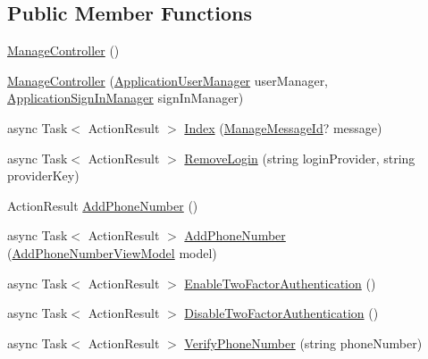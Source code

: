 \subsection*{Public Member Functions}
\begin{DoxyCompactItemize}
\item 
\mbox{\hyperlink{class_brew_day2_1_1_controllers_1_1_manage_controller_af9b638e4fc5bda5789e1a3a0e9a5d6d0}{Manage\+Controller}} ()
\item 
\mbox{\hyperlink{class_brew_day2_1_1_controllers_1_1_manage_controller_ab2152e5900c16e82846b991765fdaccc}{Manage\+Controller}} (\mbox{\hyperlink{class_brew_day2_1_1_application_user_manager}{Application\+User\+Manager}} user\+Manager, \mbox{\hyperlink{class_brew_day2_1_1_application_sign_in_manager}{Application\+Sign\+In\+Manager}} sign\+In\+Manager)
\item 
async Task$<$ Action\+Result $>$ \mbox{\hyperlink{class_brew_day2_1_1_controllers_1_1_manage_controller_a1ebef1a4534bdae4041dd80f558a05bc}{Index}} (\mbox{\hyperlink{class_brew_day2_1_1_controllers_1_1_manage_controller_a418038dc90e9d94606f474b9c06fd8c8}{Manage\+Message\+Id}}? message)
\item 
async Task$<$ Action\+Result $>$ \mbox{\hyperlink{class_brew_day2_1_1_controllers_1_1_manage_controller_abfb50c4f1b23ee3a2808e104712680cb}{Remove\+Login}} (string login\+Provider, string provider\+Key)
\item 
Action\+Result \mbox{\hyperlink{class_brew_day2_1_1_controllers_1_1_manage_controller_abcf4d61a14f8e5c0f9b440b1160f567e}{Add\+Phone\+Number}} ()
\item 
async Task$<$ Action\+Result $>$ \mbox{\hyperlink{class_brew_day2_1_1_controllers_1_1_manage_controller_ac9131442b67472e9a1583143be75879a}{Add\+Phone\+Number}} (\mbox{\hyperlink{class_brew_day2_1_1_models_1_1_add_phone_number_view_model}{Add\+Phone\+Number\+View\+Model}} model)
\item 
async Task$<$ Action\+Result $>$ \mbox{\hyperlink{class_brew_day2_1_1_controllers_1_1_manage_controller_a4bd12cede142028030a66cd324d9e7f8}{Enable\+Two\+Factor\+Authentication}} ()
\item 
async Task$<$ Action\+Result $>$ \mbox{\hyperlink{class_brew_day2_1_1_controllers_1_1_manage_controller_a1058eecf52e7a2f5dcdca0ff1fa9af21}{Disable\+Two\+Factor\+Authentication}} ()
\item 
async Task$<$ Action\+Result $>$ \mbox{\hyperlink{class_brew_day2_1_1_controllers_1_1_manage_controller_ad51359dac409064a9e554d92cec5a5fd}{Verify\+Phone\+Number}} (string phone\+Number)

\end{DoxyCompactItemize}
